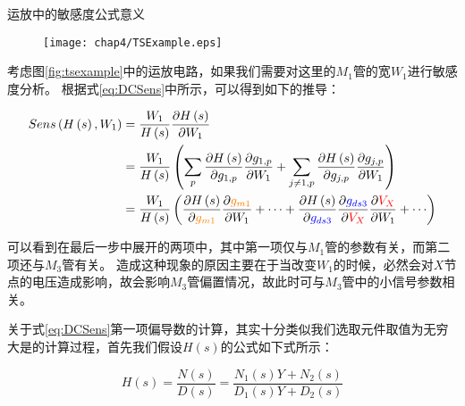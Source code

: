 \begin{exmp}
运放中的敏感度公式意义

\begin{figure}[!htp]
	\centering
	\texttt{[image: chap4/TSExample.eps]}
\end{figure}

考虑图\ref{fig:tsexample}中的运放电路，如果我们需要对这里的$M_1$管的宽$W_1$进行敏感度分析。
根据式\ref{eq:DCSens}中所示，可以得到如下的推导：

\begin{align}
Sens\left( {H\left( s \right),{W_1}} \right) &= \frac{{{W_1}}}
{{H\left( s \right)}}\frac{{\partial H\left( s \right)}}
{{\partial {W_1}}} \nonumber \\ 
&= \frac{{{W_1}}}
{{H\left( s \right)}}\left( {\sum\limits_p {\frac{{\partial H\left( s \right)}}
		{{\partial {g_{1,p}}}}\frac{{\partial {g_{1,p}}}}
		{{\partial {W_1}}}}  + \sum\limits_{j \ne 1,p} {\frac{{\partial H\left( s \right)}}
		{{\partial {g_{j,p}}}}\frac{{\partial {g_{j,p}}}}
		{{\partial {W_1}}}} } \right) \nonumber \\ 
&= \frac{{{W_1}}}
{{H\left( s \right)}}\left( {\frac{{\partial H\left( s \right)}}
	{{\partial {\textcolor{orange}{g_{m1}}}}}\frac{{\partial {\textcolor{orange}{g_{m1}}}}}
	{{\partial {W_1}}} +  \cdots  + \frac{{\partial H\left( s \right)}}
	{{\partial {\textcolor{blue}{g_{ds3}}}}}\frac{{\partial {\textcolor{blue}{g_{ds3}}}}}
	{{\partial {\textcolor{red}{V_X}}}}\frac{{\partial {\textcolor{red}{V_X}}}}
	{{\partial {W_1}}} +  \cdots } \right)
\end{align}

可以看到在最后一步中展开的两项中，其中第一项仅与$M_1$管的参数有关，而第二项还与$M_3$管有关。
造成这种现象的原因主要在于当改变$W_1$的时候，必然会对$X$节点的电压造成影响，故会影响$M_3$管偏置情况，故此时可与$M_3$管中的小信号参数相关。

\end{exmp}

关于式\ref{eq:DCSens}第一项偏导数的计算，其实十分类似我们选取元件取值为无穷大是的计算过程，首先我们假设$H\left(s\right)$的公式如下式所示：

\begin{equation}
H\left( s \right) = \frac{{N\left( s \right)}}{{D\left( s \right)}} = \frac{{{N_1}\left( s \right)Y + {N_2}\left( s \right)}}{{{D_1}\left( s \right)Y + {D_2}\left( s \right)}}
\end{equation}

